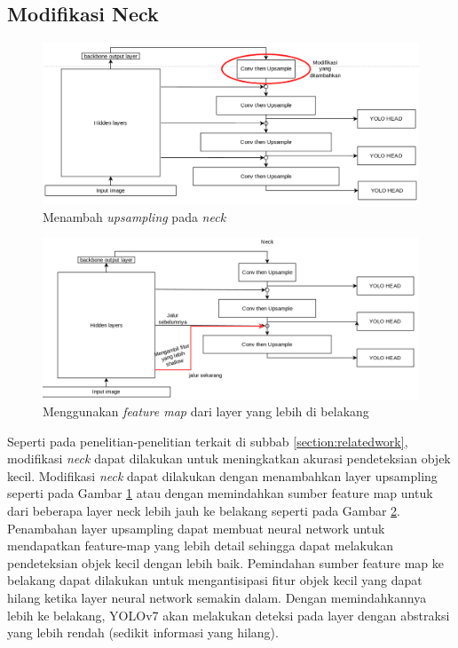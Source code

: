   \subsection{Modifikasi Neck}
    \begin{figure}[ht]
      \centering
      \includegraphics[scale=0.5]{figures/add-more-upsampling.png}
      \caption{Menambah \emph{upsampling} pada \emph{neck}}
      \label{fig:neckaddupsampling}
    \end{figure}
    \begin{figure}[ht]
      \centering
      \includegraphics[scale=0.5]{figures/neck-move-back.png}
      \caption{Menggunakan \emph{feature map} dari layer yang lebih di belakang}
      \label{fig:neckmoveback}
    \end{figure}
    Seperti pada penelitian-penelitian terkait di subbab \ref{section:relatedwork}, modifikasi \emph{neck} dapat dilakukan untuk meningkatkan akurasi pendeteksian objek kecil.
    Modifikasi \emph{neck} dapat dilakukan dengan menambahkan layer upsampling seperti pada Gambar \ref{fig:neckaddupsampling} atau dengan memindahkan sumber feature map untuk dari beberapa layer neck lebih jauh ke belakang seperti pada Gambar \ref{fig:neckmoveback}.
    Penambahan layer upsampling dapat membuat neural network untuk mendapatkan feature-map yang lebih detail sehingga dapat melakukan pendeteksian objek kecil dengan lebih baik.
    Pemindahan sumber feature map ke belakang dapat dilakukan untuk mengantisipasi fitur objek kecil yang dapat hilang ketika layer neural network semakin dalam.
    Dengan memindahkannya lebih ke belakang, YOLOv7 akan melakukan deteksi pada layer dengan abstraksi yang lebih rendah (sedikit informasi yang hilang).
